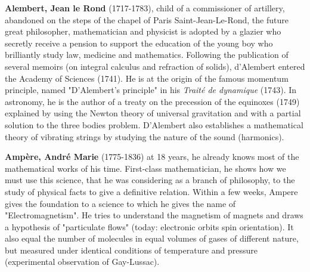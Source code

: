 \pichskip{15pt}%
\textbf{Alembert, Jean le Rond} (1717-1783), child of a commissioner of artillery, abandoned on the steps of the chapel of Paris Saint-Jean-Le-Rond, the future great philosopher, mathematician and physicist is adopted by a glazier who secretly receive a pension to support the education of the young boy who brilliantly study law, medicine and mathematics. Following the publication of several memoirs (on integral calculus and refraction of solids), d'Alembert entered the Academy of Sciences (1741). He is at the origin of the famous momentum principle, named "D'Alembert's principle" in his \textit{ Traité de dynamique} (1743). In astronomy, he is the author of a treaty on the precession of the equinoxes (1749) explained by using the Newton theory of universal gravitation and with a partial solution to the three bodies problem. D'Alembert also establishes a mathematical theory of vibrating strings by studying the nature of the sound (harmonics).

\pichskip{15pt}%
\textbf{Ampère, André Marie} (1775-1836) at 18 years, he already knows most of the mathematical works of his time. First-class mathematician, he shows how we must use this science, that he was considering as a branch of philosophy, to the study of physical facts to give a definitive relation. Within a few weeks, Ampere gives the foundation to a science to which he gives the name of "Electromagnetism". He tries to understand the magnetism of magnets and draws a hypothesis of "particulate flows" (today: electronic orbits spin orientation). It also equal the number of molecules in equal volumes of gases of different nature, but measured under identical conditions of temperature and pressure (experimental observation of Gay-Lussac).

